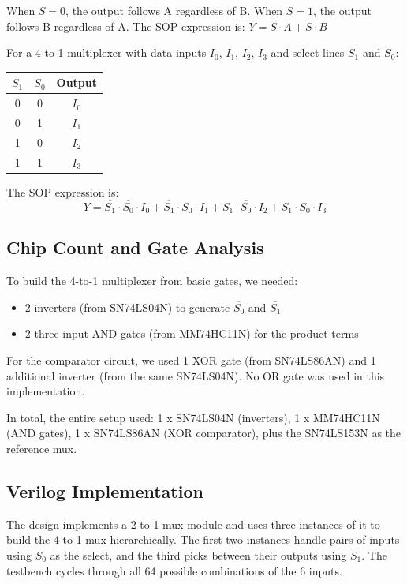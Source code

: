\documentclass[12pt, letterpaper]{article}
\begin{document}
When $S = 0$, the output follows A regardless of B. When $S = 1$, the output follows B regardless of A. The SOP expression is: $Y = \overline{S} \cdot A + S \cdot B$

For a 4-to-1 multiplexer with data inputs $I_0$, $I_1$, $I_2$, $I_3$ and select lines $S_1$ and $S_0$:

\begin{center}
  \begin{tabular}{|cc|c|}
    \hline
    $S_1$ & $S_0$ & Output \\
    \hline
    0 & 0 & $I_0$ \\
    0 & 1 & $I_1$ \\
    1 & 0 & $I_2$ \\
    1 & 1 & $I_3$ \\
    \hline
  \end{tabular}
\end{center}

The SOP expression is:
\[
Y = \overline{S_1} \cdot \overline{S_0} \cdot I_0 + \overline{S_1} \cdot S_0 \cdot I_1 + S_1 \cdot \overline{S_0} \cdot I_2 + S_1 \cdot S_0 \cdot I_3
\]

\subsection{Chip Count and Gate Analysis}

To build the 4-to-1 multiplexer from basic gates, we needed:

\begin{itemize}
  \item 2 inverters (from SN74LS04N) to generate $\overline{S_0}$ and $\overline{S_1}$
  \item 2 three-input AND gates (from MM74HC11N) for the product terms
\end{itemize}

For the comparator circuit, we used 1 XOR gate (from SN74LS86AN) and 1 additional inverter (from the same SN74LS04N). No OR gate was used in this implementation.

In total, the entire setup used: 1 x SN74LS04N (inverters), 1 x MM74HC11N (AND gates), 1 x SN74LS86AN (XOR comparator), plus the SN74LS153N as the reference mux.

\subsection{Verilog Implementation}

The design implements a 2-to-1 mux module and uses three instances of it to build the 4-to-1 mux hierarchically. The first two instances handle pairs of inputs using $S_0$ as the select, and the third picks between their outputs using $S_1$. The testbench cycles through all 64 possible combinations of the 6 inputs.
\end{document}
